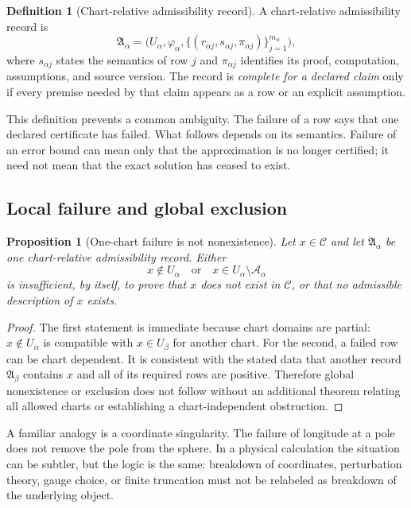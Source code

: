 \documentclass[11pt]{article}
\newtheorem{proposition}[theorem]{Proposition}
\theoremstyle{definition}
\newtheorem{definition}[theorem]{Definition}
\theoremstyle{remark}
\newcommand{\cA}{\mathcal A}
\newcommand{\cC}{\mathcal C}
\newcommand{\1}{\mathbf 1}
\begin{document}
\begin{definition}[Chart-relative admissibility record]
A chart-relative admissibility record is
\[
  \mathfrak A_\alpha
  =
  \bigl(U_\alpha,\varphi_\alpha,
        \{(r_{\alpha j},s_{\alpha j},\pi_{\alpha j})\}_{j=1}^{m_\alpha}\bigr),
\]
where \(s_{\alpha j}\) states the semantics of row \(j\) and
\(\pi_{\alpha j}\) identifies its proof, computation, assumptions, and
source version.  The record is \emph{complete for a declared claim} only if
every premise needed by that claim appears as a row or an explicit
assumption.
\end{definition}

This definition prevents a common ambiguity.  The failure of a row says
that one declared certificate has failed.  What follows depends on its
semantics.  Failure of an error bound can mean only that the approximation
is no longer certified; it need not mean that the exact solution has
ceased to exist.

\subsection{Local failure and global exclusion}

\begin{proposition}[One-chart failure is not nonexistence]
\label{prop:chart}
Let \(x\in\cC\) and let \(\mathfrak A_\alpha\) be one chart-relative
admissibility record.  Either
\[
  x\notin U_\alpha
  \quad\text{or}\quad
  x\in U_\alpha\setminus\cA_\alpha
\]
is insufficient, by itself, to prove that \(x\) does not exist in
\(\cC\), or that no admissible description of \(x\) exists.
\end{proposition}

\begin{proof}
The first statement is immediate because chart domains are partial:
\(x\notin U_\alpha\) is compatible with \(x\in U_\beta\) for another
chart.  For the second, a failed row can be chart dependent.  It is
consistent with the stated data that another record
\(\mathfrak A_\beta\) contains \(x\) and all of its required rows are
positive.  Therefore global nonexistence or exclusion does not follow
without an additional theorem relating all allowed charts or establishing
a chart-independent obstruction.
\end{proof}

A familiar analogy is a coordinate singularity.  The failure of longitude
at a pole does not remove the pole from the sphere.  In a physical
calculation the situation can be subtler, but the logic is the same:
breakdown of coordinates, perturbation theory, gauge choice, or finite
truncation must not be relabeled as breakdown of the underlying object.
\end{document}

